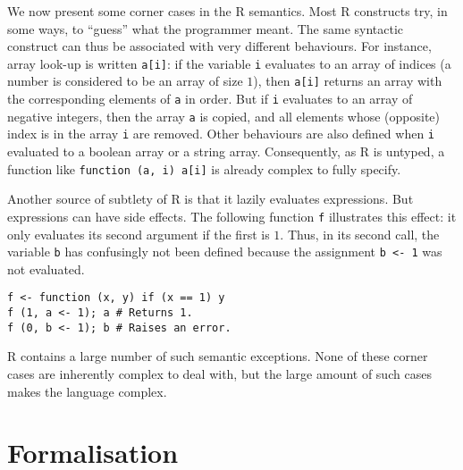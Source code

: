 \documentclass[9pt, sigplan, natbib=false, screen=true]{acmart}
\newcommand\R{R}
\begin{document}
We now present some corner cases in the \R{} semantics.
Most \R{} constructs
try, in some ways, to ``guess'' what the programmer meant.
The same syntactic construct can thus be associated
with very different behaviours.
For instance, array look-up is written \texttt{a[i]}:
if the variable \texttt{i} evaluates to an array of indices
(a number is considered to be an array of size \(1\)),
then \texttt{a[i]} returns an array with
the corresponding elements of \texttt{a} in order.
But if \texttt{i} evaluates to an array of negative integers,
then the array \texttt{a} is copied,
and all elements whose (opposite) index is in the array \texttt{i}
are removed.
Other behaviours are also defined when \texttt{i}
evaluated to a boolean array or a string array.
Consequently,
as \R{} is untyped,
a function like \texttt{function (a, i) a[i]}
is already complex to fully specify.

Another source of subtlety of \R{} is that it lazily evaluates expressions.
But expressions can have side effects.
The following function \texttt{f} illustrates this effect:
it only evaluates its second argument if the first is \(1\).
Thus, in its second call, the variable \texttt{b}
has confusingly not been defined because the assignment \texttt{b <- 1}
was not evaluated.
\begin{verbatim}
f <- function (x, y) if (x == 1) y
f (1, a <- 1); a # Returns 1.
f (0, b <- 1); b # Raises an error.
\end{verbatim}

\R{} contains a large number of such semantic exceptions.
None of these corner cases are inherently complex to deal with,
but the large amount of such cases makes the language complex.


\section{Formalisation}
\label{sec:formalisation}
\end{document}
